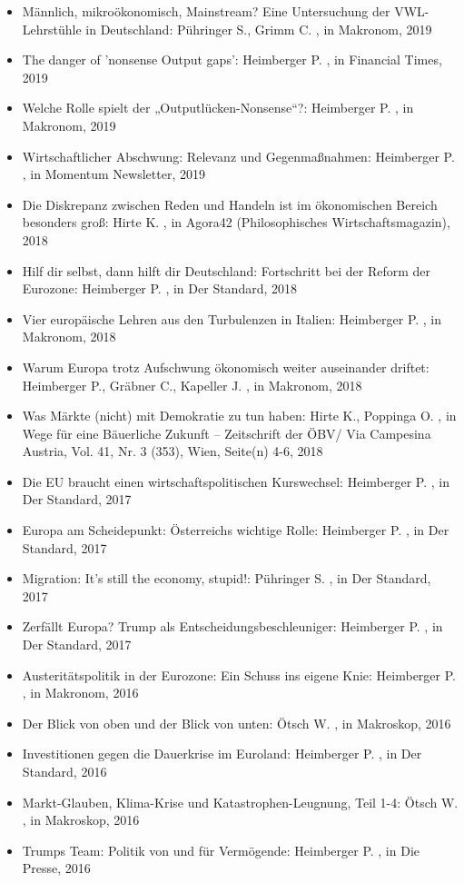 \begin{itemize}
\item Männlich, mikroökonomisch, Mainstream? Eine Untersuchung der VWL-Lehrstühle in Deutschland: Pühringer S., Grimm C. , in Makronom, 2019
\item The danger of  'nonsense Output gaps': Heimberger P. , in Financial Times, 2019
\item Welche Rolle spielt der „Outputlücken-Nonsense“?: Heimberger P. , in Makronom, 2019
\item Wirtschaftlicher Abschwung: Relevanz und Gegenmaßnahmen: Heimberger P. , in Momentum Newsletter, 2019
\item Die Diskrepanz zwischen Reden und Handeln ist im ökonomischen Bereich besonders groß: Hirte K. , in Agora42 (Philosophisches Wirtschaftsmagazin), 2018
\item Hilf dir selbst, dann hilft dir Deutschland: Fortschritt bei der Reform der Eurozone: Heimberger P. , in Der Standard, 2018
\item Vier europäische Lehren aus den Turbulenzen in Italien: Heimberger P. , in Makronom, 2018
\item Warum Europa trotz Aufschwung ökonomisch weiter auseinander driftet: Heimberger P., Gräbner C., Kapeller J. , in Makronom, 2018
\item Was Märkte (nicht) mit Demokratie zu tun haben: Hirte K., Poppinga O. , in Wege für eine Bäuerliche Zukunft – Zeitschrift der ÖBV/ Via Campesina Austria, Vol. 41, Nr. 3 (353), Wien, Seite(n) 4-6, 2018
\item Die EU braucht einen wirtschaftspolitischen Kurswechsel: Heimberger P. , in Der Standard, 2017
\item Europa am Scheidepunkt: Österreichs wichtige Rolle: Heimberger P. , in Der Standard, 2017
\item Migration: It's still the economy, stupid!: Pühringer S. , in Der Standard, 2017
\item Zerfällt Europa? Trump als Entscheidungsbeschleuniger: Heimberger P. , in Der Standard, 2017
\item Austeritätspolitik in der Eurozone: Ein Schuss ins eigene Knie: Heimberger P. , in Makronom, 2016
\item Der Blick von oben und der Blick von unten: Ötsch W. , in Makroskop, 2016
\item Investitionen gegen die Dauerkrise im Euroland: Heimberger P. , in Der Standard, 2016
\item Markt-Glauben, Klima-Krise und Katastrophen-Leugnung, Teil 1-4: Ötsch W. , in Makroskop, 2016
\item Trumps Team: Politik von und für Vermögende: Heimberger P. , in Die Presse, 2016

\end{itemize}
